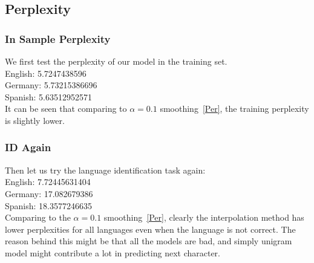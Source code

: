 \documentclass{article}
\begin{document}
\subsection{Perplexity}
\subsubsection{In Sample Perplexity}
We first test the perplexity of our model in the training set.\\
English: 5.7247438596\\
Germany: 5.73215386696\\
Spanish: 5.63512952571\\

It can be seen that comparing to $\alpha=0.1$ smoothing~\ref{Per}, the training perplexity is slightly lower.
\subsubsection{ID Again}
Then let us try the language identification task again:\\
English: 7.72445631404\\
Germany: 17.082679386\\
Spanish: 18.3577246635\\

Comparing to the $\alpha=0.1$ smoothing~\ref{Per}, clearly the interpolation method has lower perplexities for all languages even when the language is not correct. The reason behind this might be that all the models are bad, and simply unigram model might contribute a lot in predicting next character.





\end{document}

